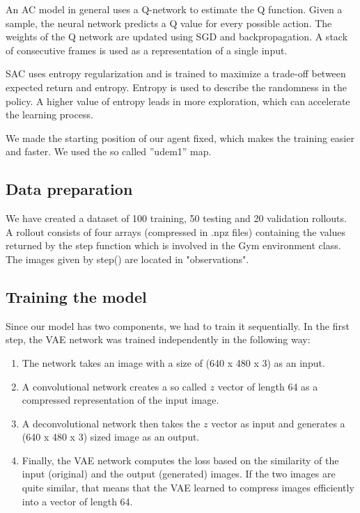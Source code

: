 \documentclass{article}
\begin{document}
An AC model in general uses a Q-network to estimate the Q function. Given a sample, the neural network predicts a Q value for every possible action. The weights of the Q network are updated using SGD and backpropagation. A stack of consecutive frames is used as a representation of a single input.

SAC uses entropy regularization and is trained to maximize a trade-off between expected return and entropy. Entropy is used to describe the randomness in the policy. A higher value of entropy leads in more exploration, which can accelerate the learning process.

We made the starting position of our agent fixed, which makes the training easier and faster. We used the so called ''udem1'' map.




\subsection{Data preparation}
We have created a dataset of 100 training, 50 testing and 20 validation rollouts. A rollout consists of four arrays (compressed in .npz files) containing the values returned by the step function which is involved in the Gym environment class. The images given by step() are located in "observations".

\subsection{Training the model}
Since our model has two components, we had to train it sequentially. In the first step, the VAE network was trained independently in the following way:
\begin{enumerate}
    \item The network takes an image with a size of (640 x 480 x 3) as an input.
    \item A convolutional network creates a so called $z$ vector of length 64 as a compressed representation of the input image.
    \item A deconvolutional network then takes the $z$ vector as input and generates a (640 x 480 x 3) sized image as an output.
    \item Finally, the VAE network computes the loss based on the similarity of the input (original) and the output (generated) images. If the two images are quite similar, that means that the VAE learned to compress images efficiently into a vector of length 64.
\end{enumerate}
\end{document}
